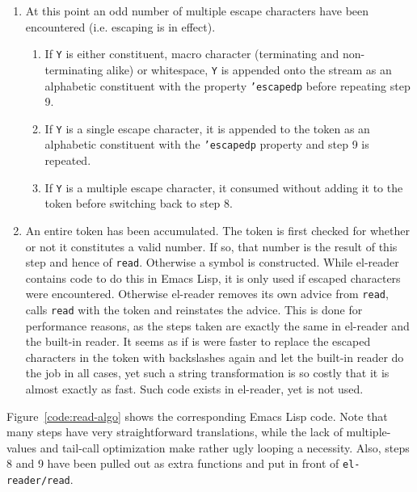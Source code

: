 \documentclass[a4paper,10pt,twoside]{report}
\newcommand{\el}{Emacs Lisp}
\newcommand{\elr}{el-reader}
\newcommand{\fun}[1]{\texttt{#1}}
\newcommand{\Read}{\fun{read}}
\begin{document}
\begin{enumerate}
\item At this point an odd number of multiple escape characters have been
  encountered (i.e. escaping is in effect). 
  \begin{enumerate}
  \item If \texttt{Y} is either constituent, macro character (terminating and
    non-terminating alike) or whitespace, \texttt{Y} is appended onto the stream
    as an alphabetic constituent with the property \texttt{'escapedp} before
    repeating step 9.
  \item If \texttt{Y} is a single escape character, it is appended to the token
    as an alphabetic constituent with the \texttt{'escapedp} property and step 9
    is repeated.
  \item If \texttt{Y} is a multiple escape character, it consumed without adding
    it to the token before switching back to step 8.
  \end{enumerate}
\item An entire token has been accumulated.  The token is first checked for
  whether or not it constitutes a valid number.  If so, that number is the
  result of this step and hence of \Read{}.  Otherwise a symbol is constructed.
  While \elr{} contains code to do this in \el{}, it is only used if escaped
  characters were encountered.  Otherwise \elr{} removes its own advice from
  \Read{}, calls \Read{} with the token and reinstates the advice.  This is done
  for performance reasons, as the steps taken are exactly the same in \elr{} and
  the built-in reader.  It seems as if is were faster to replace the escaped
  characters in the token with backslashes again and let the built-in reader do
  the job in all cases, yet such a string transformation is so costly that it is
  almost exactly as fast.  Such code exists in \elr{}, yet is not used.
\end{enumerate}

Figure~\ref{code:read-algo} shows the corresponding \el{} code.  Note that many
steps have very straightforward translations, while the lack of multiple-values
and tail-call optimization make rather ugly looping a necessity.  Also, steps 8
and 9 have been pulled out as extra functions and put in front of
\fun{el-reader/read}. 
\end{document}
